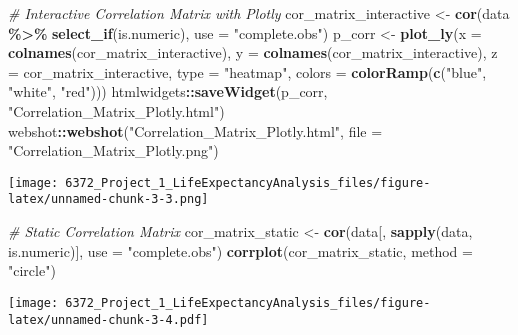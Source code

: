 \documentclass[
]{article}
\newenvironment{Shaded}{\begin{snugshade}}{\end{snugshade}}
\newcommand{\AttributeTok}[1]{\textcolor[rgb]{0.13,0.29,0.53}{#1}}
\newcommand{\CommentTok}[1]{\textcolor[rgb]{0.56,0.35,0.01}{\textit{#1}}}
\newcommand{\FunctionTok}[1]{\textcolor[rgb]{0.13,0.29,0.53}{\textbf{#1}}}
\newcommand{\NormalTok}[1]{#1}
\newcommand{\OtherTok}[1]{\textcolor[rgb]{0.56,0.35,0.01}{#1}}
\newcommand{\SpecialCharTok}[1]{\textcolor[rgb]{0.81,0.36,0.00}{\textbf{#1}}}
\newcommand{\StringTok}[1]{\textcolor[rgb]{0.31,0.60,0.02}{#1}}
\begin{document}
\begin{Shaded}
\begin{Highlighting}[]
\CommentTok{\# Interactive Correlation Matrix with Plotly}
\NormalTok{cor\_matrix\_interactive }\OtherTok{\textless{}{-}} \FunctionTok{cor}\NormalTok{(data }\SpecialCharTok{\%\textgreater{}\%} \FunctionTok{select\_if}\NormalTok{(is.numeric), }\AttributeTok{use =} \StringTok{"complete.obs"}\NormalTok{)}
\NormalTok{p\_corr }\OtherTok{\textless{}{-}} \FunctionTok{plot\_ly}\NormalTok{(}\AttributeTok{x =} \FunctionTok{colnames}\NormalTok{(cor\_matrix\_interactive), }\AttributeTok{y =} \FunctionTok{colnames}\NormalTok{(cor\_matrix\_interactive), }\AttributeTok{z =}\NormalTok{ cor\_matrix\_interactive, }
                  \AttributeTok{type =} \StringTok{"heatmap"}\NormalTok{, }\AttributeTok{colors =} \FunctionTok{colorRamp}\NormalTok{(}\FunctionTok{c}\NormalTok{(}\StringTok{"blue"}\NormalTok{, }\StringTok{"white"}\NormalTok{, }\StringTok{"red"}\NormalTok{)))}
\NormalTok{htmlwidgets}\SpecialCharTok{::}\FunctionTok{saveWidget}\NormalTok{(p\_corr, }\StringTok{"Correlation\_Matrix\_Plotly.html"}\NormalTok{)}
\NormalTok{webshot}\SpecialCharTok{::}\FunctionTok{webshot}\NormalTok{(}\StringTok{"Correlation\_Matrix\_Plotly.html"}\NormalTok{, }\AttributeTok{file =} \StringTok{"Correlation\_Matrix\_Plotly.png"}\NormalTok{)}
\end{Highlighting}
\end{Shaded}

\texttt{[image: 6372\_Project\_1\_LifeExpectancyAnalysis\_files/figure-latex/unnamed-chunk-3-3.png]}

\begin{Shaded}
\begin{Highlighting}[]
\CommentTok{\# Static Correlation Matrix}
\NormalTok{cor\_matrix\_static }\OtherTok{\textless{}{-}} \FunctionTok{cor}\NormalTok{(data[, }\FunctionTok{sapply}\NormalTok{(data, is.numeric)], }\AttributeTok{use =} \StringTok{"complete.obs"}\NormalTok{)}
\FunctionTok{corrplot}\NormalTok{(cor\_matrix\_static, }\AttributeTok{method =} \StringTok{"circle"}\NormalTok{)}
\end{Highlighting}
\end{Shaded}

\texttt{[image: 6372\_Project\_1\_LifeExpectancyAnalysis\_files/figure-latex/unnamed-chunk-3-4.pdf]}
\end{document}
